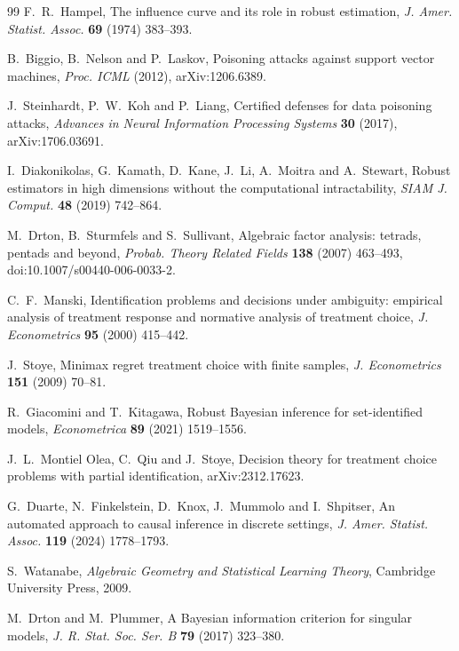 \documentclass[11pt]{article}
\theoremstyle{definition}\newtheorem{definition}{Definition}\newtheorem{remark}{Remark}
\begin{document}
\begin{thebibliography}{99}
 F.~R.~Hampel, The influence curve and its role in robust estimation, \emph{J. Amer. Statist. Assoc.} \textbf{69} (1974) 383--393.

 B.~Biggio, B.~Nelson and P.~Laskov, Poisoning attacks against support vector machines, \emph{Proc. ICML} (2012), arXiv:1206.6389.

 J.~Steinhardt, P.~W.~Koh and P.~Liang, Certified defenses for data poisoning attacks, \emph{Advances in Neural Information Processing Systems} \textbf{30} (2017), arXiv:1706.03691.

 I.~Diakonikolas, G.~Kamath, D.~Kane, J.~Li, A.~Moitra and A.~Stewart, Robust estimators in high dimensions without the computational intractability, \emph{SIAM J. Comput.} \textbf{48} (2019) 742--864.

 M.~Drton, B.~Sturmfels and S.~Sullivant, Algebraic factor analysis: tetrads, pentads and beyond, \emph{Probab. Theory Related Fields} \textbf{138} (2007) 463--493, doi:10.1007/s00440-006-0033-2.

 C.~F.~Manski, Identification problems and decisions under ambiguity: empirical analysis of treatment response and normative analysis of treatment choice, \emph{J. Econometrics} \textbf{95} (2000) 415--442.

 J.~Stoye, Minimax regret treatment choice with finite samples, \emph{J. Econometrics} \textbf{151} (2009) 70--81.

 R.~Giacomini and T.~Kitagawa, Robust Bayesian inference for set-identified models, \emph{Econometrica} \textbf{89} (2021) 1519--1556.

 J.~L.~Montiel Olea, C.~Qiu and J.~Stoye, Decision theory for treatment choice problems with partial identification, arXiv:2312.17623.

 G.~Duarte, N.~Finkelstein, D.~Knox, J.~Mummolo and I.~Shpitser, An automated approach to causal inference in discrete settings, \emph{J. Amer. Statist. Assoc.} \textbf{119} (2024) 1778--1793.

 S.~Watanabe, \emph{Algebraic Geometry and Statistical Learning Theory}, Cambridge University Press, 2009.

 M.~Drton and M.~Plummer, A Bayesian information criterion for singular models, \emph{J. R. Stat. Soc. Ser. B} \textbf{79} (2017) 323--380.


\end{thebibliography}
\end{document}
